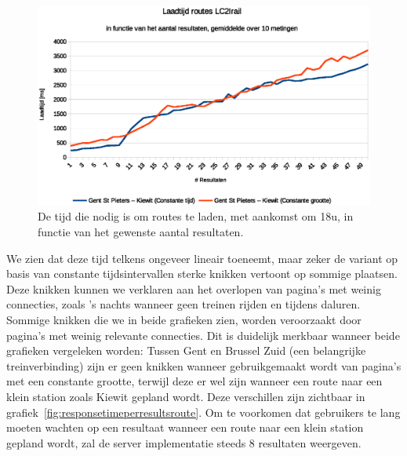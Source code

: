 \begin{figure}[h]
	\centering
	\includegraphics[width=1.00\textwidth]{images/Laadtijd_routes_Gent-St-Pieters_Kiewit.eps}	\caption[Laadtijd van routes tussen Gent en Kiewit in functie van aantal resultaten]{De tijd die nodig is om routes te laden, met aankomst om 18u, in functie van het gewenste aantal resultaten.}
	\label{fig:responsetimeperresultsrouteKiewit}
\end{figure}

We zien dat deze tijd telkens ongeveer lineair toeneemt, maar zeker de variant op basis van constante tijdsintervallen sterke knikken vertoont op sommige plaatsen. Deze knikken kunnen we verklaren aan het overlopen van pagina's met weinig connecties, zoals 's nachts wanneer geen treinen rijden en tijdens daluren. Sommige knikken die we in beide grafieken zien, worden veroorzaakt door pagina's met weinig relevante connecties. Dit is duidelijk merkbaar wanneer beide grafieken vergeleken worden: Tussen Gent en Brussel Zuid (een belangrijke treinverbinding) zijn er geen knikken wanneer gebruikgemaakt wordt van pagina's met een constante grootte, terwijl deze er wel zijn wanneer een route naar een klein station zoals Kiewit gepland wordt. Deze verschillen zijn zichtbaar in grafiek~\ref{fig:responsetimeperresultsroute}. Om te voorkomen dat gebruikers te lang moeten wachten op een resultaat wanneer een route naar een klein station gepland wordt, zal de server implementatie steeds 8 resultaten weergeven.

